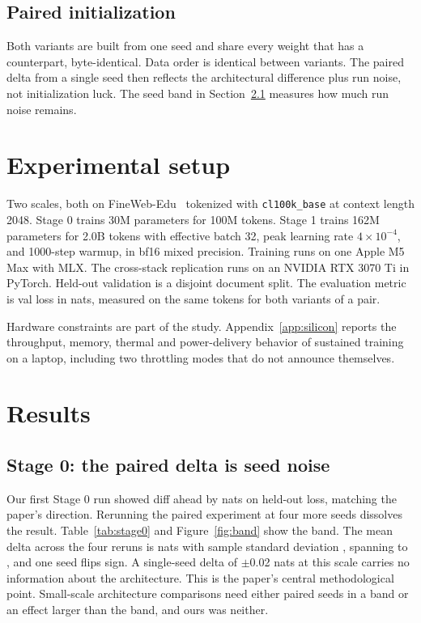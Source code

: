 \documentclass[11pt]{article}
\begin{document}
\subsection{Paired initialization}
Both variants are built from one seed and share every weight that has a
counterpart, byte-identical. Data order is identical between variants.
The paired delta from a single seed then reflects the architectural
difference plus run noise, not initialization luck. The seed band in
Section~\ref{sec:stage0} measures how much run noise remains.

\section{Experimental setup}
Two scales, both on FineWeb-Edu~\cite{penedo2024fineweb} tokenized with
\texttt{cl100k\_base} at context length 2048. Stage 0 trains 30M
parameters for 100M tokens. Stage 1 trains 162M parameters for 2.0B
tokens with effective batch 32, peak learning rate $4 \times 10^{-4}$,
and 1000-step warmup, in bf16 mixed precision. Training runs on one
Apple M5 Max with MLX. The cross-stack replication runs on an NVIDIA
RTX 3070 Ti in PyTorch. Held-out validation is a disjoint document
split. The evaluation metric is val loss in nats, measured on the same
tokens for both variants of a pair.

Hardware constraints are part of the study. Appendix~\ref{app:silicon}
reports the throughput, memory, thermal and power-delivery behavior of
sustained training on a laptop, including two throttling modes that do
not announce themselves.

\section{Results}

\subsection{Stage 0: the paired delta is seed noise}
\label{sec:stage0}
Our first Stage 0 run showed diff ahead by \StageZeroRecordedDelta{}
nats on held-out loss, matching the paper's direction. Rerunning the
paired experiment at four more seeds dissolves the result.
Table~\ref{tab:stage0} and Figure~\ref{fig:band} show the band. The
mean delta across the four reruns is \StageZeroMeanDelta{} nats with
sample standard deviation \StageZeroStdDelta{}, spanning
\StageZeroMinDelta{} to \StageZeroMaxDelta{}, and one seed flips sign.
A single-seed delta of $\pm$0.02 nats at this scale carries no
information about the architecture. This is the paper's central
methodological point. Small-scale architecture comparisons need either
paired seeds in a band or an effect larger than the band, and ours was
neither.
\end{document}
